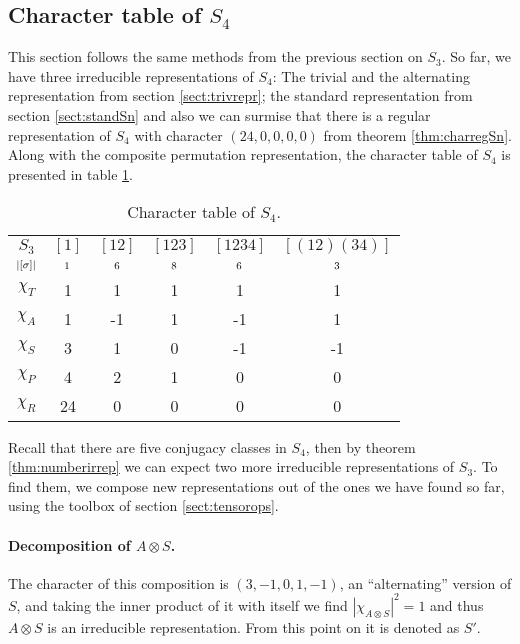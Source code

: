 \subsection{Character table of $S_4$}

This section follows the same methods from the previous section on $S_3$. So far, we have three irreducible representations of $S_4$: The trivial and the alternating representation from section \ref{sect:trivrepr}; the standard representation from section \ref{sect:standSn} and also we can surmise that there is a regular representation of $S_4$ with character $(24,0,0,0,0)$ from theorem \ref{thm:charregSn}. Along with the composite permutation representation, the character table of $S_4$ is presented in table \ref{table:charS4}. 

\begin{table}[hbt!]
	\centering
	\begin{tabular}{c | c c c c c}
		     $S_3$      & $[1]$   & $[12]$  & $[123]$ & $[1234]$ & $[(12)(34)]$ \\
		$\scriptstyle|[\sigma]|$ & $\scriptstyle 1$ & $\scriptstyle 6$ & $\scriptstyle 8$ & $\scriptstyle 6$  & $\scriptstyle 3$      \\ \hline
		   $\chi_T$     & 1       & 1       & 1       & 1        & 1            \\
		   $\chi_A$     & 1       & -1      & 1       & -1       & 1            \\
		   $\chi_S$     & 3       & 1       & 0       & -1       & -1           \\ \hdashline
		   $\chi_P$     & 4       & 2       & 1       & 0        & 0            \\
		   $\chi_R$     & 24      & 0       & 0       & 0        & 0            	\end{tabular}
	\caption{Character table of $S_4$.}
	\label{table:charS4}
\end{table}

Recall that there are five conjugacy classes in $S_4$, then by theorem \ref{thm:numberirrep} we can expect two more irreducible representations of $S_3$. To find them, we compose new representations out of the ones we have found so far, using the toolbox of section \ref{sect:tensorops}.

\paragraph{Decomposition of $A \otimes S$.} The character of this composition is $(3,-1,0,1,-1)$, an ``alternating'' version of $S$, and taking the inner product of it with itself we find $|\chi_{A \otimes S}|^2 = 1$ and thus $A \otimes S$ is an irreducible representation. From this point on it is denoted as $S'$.

